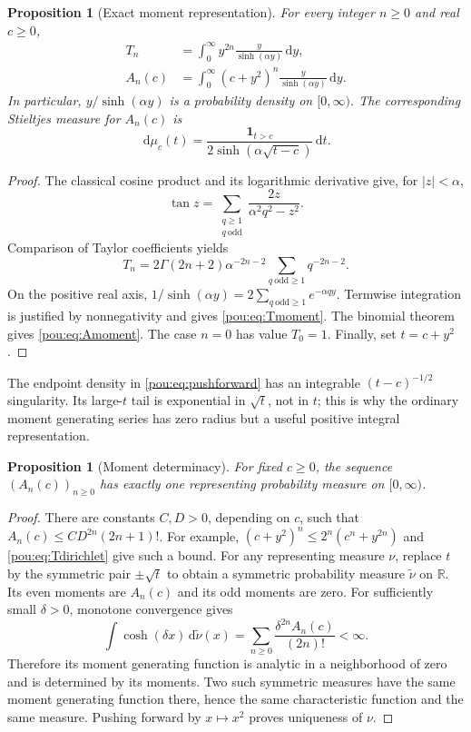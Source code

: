 \documentclass[11pt]{article}
\newtheorem{proposition}[theorem]{Proposition}
\theoremstyle{definition}
\theoremstyle{remark}
\newcommand{\R}{\mathbb R}
\newcommand{\dd}{\,\mathrm d}
\newcommand{\ind}{\mathbf 1}
\begin{document}
\begin{proposition}[Exact moment representation]\label{pou:prop:moment}
For every integer $n\ge0$ and real $c\ge0$,
\begin{align}
 T_n&=\int_0^\infty y^{2n}\frac{y}{\sinh(\alpha y)}\dd y,
 \label{pou:eq:Tmoment}\\
 A_n(c)&=\int_0^\infty(c+y^2)^n\frac{y}{\sinh(\alpha y)}\dd y.
 \label{pou:eq:Amoment}
\end{align}
In particular, $y/\sinh(\alpha y)$ is a probability density on $[0,\infty)$.
The corresponding Stieltjes measure for $A_n(c)$ is
\begin{equation}\label{pou:eq:pushforward}
 \dd\mu_c(t)=\frac{\ind_{t>c}}{2\sinh(\alpha\sqrt{t-c})}\dd t.
\end{equation}
\end{proposition}
\begin{proof}
The classical cosine product \cite{dlmfcos} and its logarithmic derivative
give, for $|z|<\alpha$,
\[
 \tan z=\sum_{\substack{q\ge1\\q\ \mathrm{odd}}}
 \frac{2z}{\alpha^2q^2-z^2}.
\]
Comparison of Taylor coefficients yields
\begin{equation}\label{pou:eq:Tdirichlet}
 T_n=2\Gamma(2n+2)\alpha^{-2n-2}
       \sum_{q\ \mathrm{odd}\ge1}q^{-2n-2}.
\end{equation}
On the positive real axis,
$1/\sinh(\alpha y)=2\sum_{q\ \mathrm{odd}\ge1}e^{-\alpha qy}$.
Termwise integration is justified by nonnegativity and gives
\eqref{pou:eq:Tmoment}.  The binomial theorem gives \eqref{pou:eq:Amoment}.
The case $n=0$ has value $T_0=1$.  Finally, set $t=c+y^2$.
\end{proof}

The endpoint density in \eqref{pou:eq:pushforward} has an integrable
$(t-c)^{-1/2}$ singularity.  Its large-$t$ tail is exponential in $\sqrt t$,
not in $t$; this is why the ordinary moment generating series has zero
radius but a useful positive integral representation.

\begin{proposition}[Moment determinacy]\label{pou:prop:determinate}
For fixed $c\ge0$, the sequence $(A_n(c))_{n\ge0}$ has exactly one
representing probability measure on $[0,\infty)$.
\end{proposition}
\begin{proof}
There are constants $C,D>0$, depending on $c$, such that
$A_n(c)\le C D^{2n}(2n+1)!$.  For example,
$(c+y^2)^n\le2^n(c^n+y^{2n})$ and \eqref{pou:eq:Tdirichlet} give such a bound.
For any representing measure $\nu$, replace $t$ by the symmetric pair
$\pm\sqrt t$ to obtain a symmetric probability measure $\widetilde\nu$
on $\R$.  Its even moments are $A_n(c)$ and its odd moments are zero.
For sufficiently small $\delta>0$, monotone convergence gives
\[
 \int\cosh(\delta x)\dd\widetilde\nu(x)
 =\sum_{n\ge0}\frac{\delta^{2n}A_n(c)}{(2n)!}<\infty.
\]
Therefore its moment generating function is analytic in a neighborhood of
zero and is determined by its moments.  Two such symmetric measures have
the same moment generating function there, hence the same characteristic
function and the same measure.  Pushing forward by $x\mapsto x^2$ proves
uniqueness of $\nu$.
\end{proof}
\end{document}
